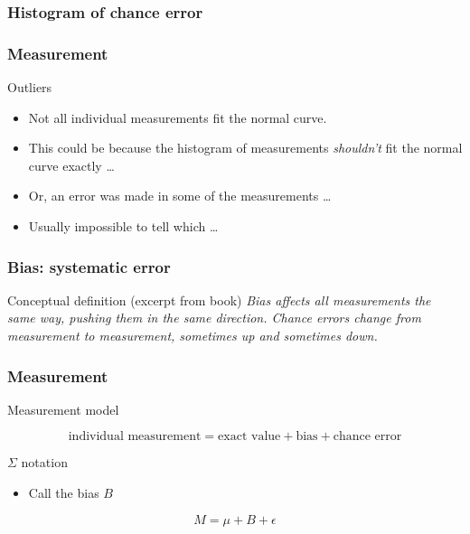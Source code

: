 \documentclass[handout]{beamer}
\begin{document}
   \begin{frame}
   \frametitle{Histogram of chance error}
   \begin{center}
   \end{center}

   \end{frame}


   \begin{frame} \frametitle{Measurement}

   \begin{block}
   {Outliers}
   \begin{itemize}
   \item Not all individual measurements fit the
   normal curve.
   \item This could be because the histogram of
   measurements {\em shouldn't} fit the normal curve exactly \dots
   \item Or, an error was made in some of the measurements \dots
   \item Usually impossible to tell which \dots
   \end{itemize}
   \end{block}
   \end{frame}


   \begin{frame} \frametitle{Bias: systematic error}

   \begin{block}
   {Conceptual definition (excerpt from book)}
   {\em Bias affects all measurements the same way, pushing them
   in the same direction. Chance errors change from measurement
   to measurement, sometimes up and sometimes down.}
   \end{block}
   \end{frame}


   \begin{frame} \frametitle{Measurement}

   \begin{block}
   {Measurement model}

   $$
   \text{individual measurement} = \text{exact value} + \text{bias} + \text{chance error}
   $$
   \end{block}

   \begin{block}
   {$\Sigma$ notation}

   \begin{itemize}
   \item Call the bias $B$
   \end{itemize}

   $$
   M = \mu + B + \epsilon
   $$
   \end{block}
   \end{frame}
\end{document}
